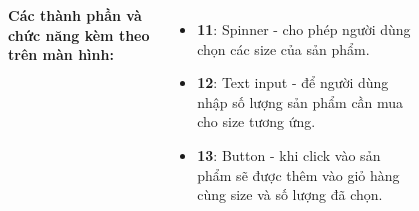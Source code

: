 \documentclass{beamer}
\begin{document}
\begin{frame}
\begin{columns}
\begin{figure}
        \end{figure}
        \indent \textbf{Các thành phần và chức năng kèm theo trên màn hình:}
        \begin{itemize}
            \item \textbf{11}: Spinner - cho phép người dùng chọn các size của sản phẩm.
            \item \textbf{12}: Text input - để người dùng nhập số lượng sản phẩm cần mua cho size tương ứng.
            \item \textbf{13}: Button - khi click vào sản phẩm sẽ được thêm vào giỏ hàng cùng size và số lượng đã chọn.
        \end{itemize}
    \end{columns}
\end{frame}
\end{document}
